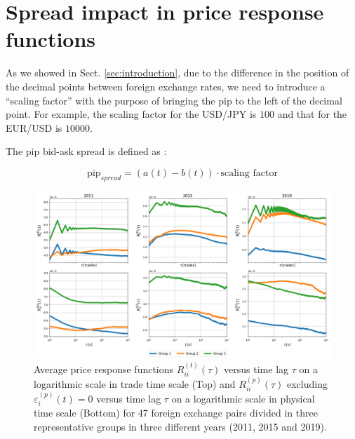\section{Spread impact in price response functions}\label{sec:spread_impact}


As we showed in Sect. \ref{sec:introduction}, due to the difference in the position of the decimal
points between foreign exchange rates, we need to introduce a ``scaling factor''
with the purpose of bringing the pip to the left of the decimal point.
For example, the scaling factor for the USD/JPY is $100$ and that for the
EUR/USD is $10000$.

The pip bid-ask spread is defined as \cite{micro_eff}:

\begin{equation}
    \text{pip}_{spread} = \left(a\left(t\right) - b\left(t\right)\right) \cdot \text{scaling factor}
\end{equation}

\begin{figure}[htbp]
    \centering
    \includegraphics[width=\textwidth]{figures/05_spread_impact.png}
    \caption{Average price response functions
             $R^{\left(t\right)}_{ii}\left(\tau\right)$ versus time lag $\tau$
             on a logarithmic scale in trade time scale (Top) and
             $R^{\left(p\right)}_{ii}\left(\tau\right)$ excluding
             $\varepsilon^{\left(p\right)}_{i}\left(t\right) = 0$ versus time
             lag $\tau$ on a logarithmic scale in physical time scale (Bottom)
             for 47 foreign exchange pairs divided in three representative
             groups in three different years (2011, 2015 and 2019).}
    \label{fig:spread_impact}
\end{figure}